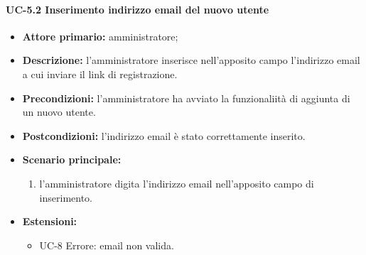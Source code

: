     \paragraph{UC-5.2 Inserimento indirizzo email del nuovo utente}
    \begin{itemize}
        \item \textbf{Attore primario:} amministratore; 
    
        \item \textbf{Descrizione:} l'amministratore inserisce nell'apposito campo l'indirizzo email a cui inviare il link di registrazione.
    
        \item \textbf{Precondizioni:} l'amministratore ha avviato la funzionaliità di aggiunta di un nuovo utente.
    
        \item \textbf{Postcondizioni:} l'indirizzo email è stato correttamente inserito.
    
        \item \textbf{Scenario principale:}
              \begin{enumerate}
                  \item l'amministratore digita l'indirizzo email nell'apposito campo di inserimento.
              \end{enumerate}
        \item \textbf{Estensioni:}
              \begin{itemize}
                    \item UC-8 Errore: email non valida.
            \end{itemize}
    \end{itemize}

